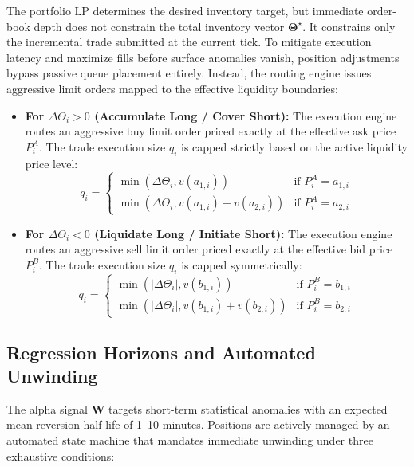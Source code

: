 \documentclass[11pt, a4paper]{article}
\begin{document}
The portfolio LP determines the desired inventory target, but immediate order-book depth does not constrain the total inventory vector $\boldsymbol{\Theta}^\star$. It constrains only the incremental trade submitted at the current tick. To mitigate execution latency and maximize fills before surface anomalies vanish, position adjustments bypass passive queue placement entirely. Instead, the routing engine issues aggressive limit orders mapped to the effective liquidity boundaries:
\begin{itemize}
    \item \textbf{For $\Delta\Theta_i > 0$ (Accumulate Long / Cover Short):} The execution engine routes an aggressive buy limit order priced exactly at the effective ask price $P^A_i$. The trade execution size $q_i$ is capped strictly based on the active liquidity price level:
    \begin{equation}
    q_i = \begin{cases}
    \min(\Delta\Theta_i, v(a_{1,i})) & \text{if } P^A_i = a_{1,i} \\
    \min(\Delta\Theta_i, v(a_{1,i}) + v(a_{2,i})) & \text{if } P^A_i = a_{2,i}
    \end{cases}
    \end{equation}
    \item \textbf{For $\Delta\Theta_i < 0$ (Liquidate Long / Initiate Short):} The execution engine routes an aggressive sell limit order priced exactly at the effective bid price $P^B_i$. The trade execution size $q_i$ is capped symmetrically:
    \begin{equation}
    q_i = \begin{cases}
    \min(|\Delta\Theta_i|, v(b_{1,i})) & \text{if } P^B_i = b_{1,i} \\
    \min(|\Delta\Theta_i|, v(b_{1,i}) + v(b_{2,i})) & \text{if } P^B_i = b_{2,i}
    \end{cases}
    \end{equation}
\end{itemize}

\subsection{Regression Horizons and Automated Unwinding}
\label{subsec:automated-unwinding}
The alpha signal $\mathbf{W}$ targets short-term statistical anomalies with an expected mean-reversion half-life of 1--10 minutes. Positions are actively managed by an automated state machine that mandates immediate unwinding under three exhaustive conditions:
\end{document}
